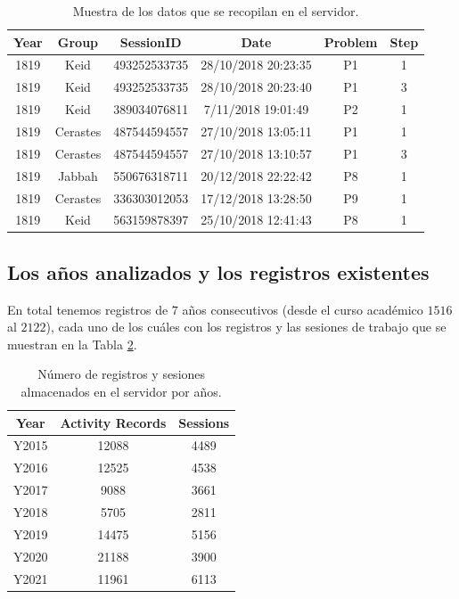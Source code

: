 \begin{table}[H]
\centering
\caption{Muestra de los datos que se recopilan en el servidor.}
\label{tab:example}
\begin{tabular}{cccccc}
\hline
\textbf{Year} & \textbf{Group} & \textbf{SessionID} & \textbf{Date}       & \textbf{Problem} & \textbf{Step} \\ \hline
1819          & Keid           & 493252533735       & 28/10/2018 20:23:35 & P1               & 1             \\ 
1819          & Keid           & 493252533735       & 28/10/2018 20:23:40 & P1               & 3             \\ 
1819          & Keid           & 389034076811       & 7/11/2018 19:01:49  & P2               & 1             \\
1819          & Cerastes       & 487544594557       & 27/10/2018 13:05:11 & P1               & 1             \\
1819          & Cerastes       & 487544594557       & 27/10/2018 13:10:57 & P1               & 3             \\
1819          & Jabbah         & 550676318711       & 20/12/2018 22:22:42 & P8               & 1             \\
1819          & Cerastes       & 336303012053       & 17/12/2018 13:28:50 & P9               & 1             \\ 
1819          & Keid           & 563159878397       & 25/10/2018 12:41:43 & P8               & 1             \\ \hline
\end{tabular}
\end{table}

\subsection{Los años analizados y los registros existentes}
En total tenemos registros de $7$ años consecutivos (desde el curso académico $1516$ al $2122$), cada uno de los cuáles con los registros y las sesiones de trabajo que se muestran en la Tabla \ref{tab:records}.

\begin{table}[H]
\centering
\caption{Número de registros y sesiones almacenados en el servidor por años.}
\label{tab:records}
\begin{tabular}{ccc}
\hline
\textbf{Year}  & \textbf{Activity Records} & \textbf{Sessions}  \\ \hline
Y2015 & 12088            &  4489  \\
Y2016 & 12525            &  4538  \\
Y2017 & 9088             &  3661  \\
Y2018 & 5705             &  2811  \\
Y2019 & 14475            &  5156  \\
Y2020 & 21188            &  3900  \\
Y2021 & 11961            &  6113  \\ \hline
\end{tabular}
\end{table}

